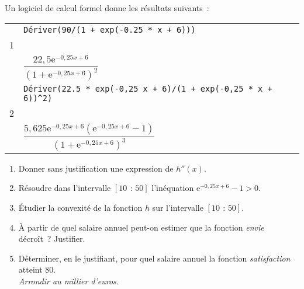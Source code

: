 Un logiciel de calcul formel donne les résultats suivants~:
\begin{center}
     \begin{extern}%
          \renewcommand{\arraystretch}{1.5}
          \begin{tabular}{|l|l|}
               \hline
               & \verb!Dériver(90/(1 + exp(-0.25 * x + 6))) !\\
               1 & \\
               & \hfill{}$\dfrac{22,5 \text{e}^{-0,25x+6}}{\left(1+\text{e}^{-0,25x+6}\right)^2}$\rule[-20pt]{0pt}{0pt}\\
               \hline
               & \verb!Dériver(22.5 * exp(-0,25 x + 6)/(1 + exp(-0,25 * x + 6))^2) !\\
               2 & \\
               & \hfill{}$\dfrac{5,625 \text{e}^{-0,25x+6} \left(\text{e}^{-0,25x + 6} -1\right)}{\left(1+\text{e}^{-0,25x+6}\right)^3}$\rule[-20pt]{0pt}{0pt}\\
               \hline
          \end{tabular}
     \end{extern}
\end{center}
\begin{enumerate}
     \item Donner sans justification une expression de $h''(x)$.
     \item Résoudre dans l'intervalle $[10\,~:\,50]$ l'inéquation $\text{e}^{-0,25x+6}-1>0$.
     \item \'Etudier la convexité de la fonction $h$ sur l'intervalle $[10\,~:\,50]$.
     \item À partir de quel salaire annuel peut-on estimer que la fonction \og \emph{envie} \fg{} décroît~? Justifier.
     \item Déterminer, en le justifiant, pour quel salaire annuel la fonction \og \emph{satisfaction} \fg{} atteint 80.\\ \emph{Arrondir au millier d'euros.}
\end{enumerate}
